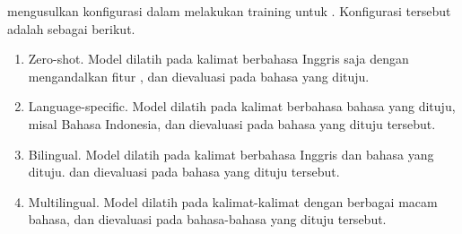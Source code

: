 \textcite{blloshmi2020} mengusulkan konfigurasi dalam melakukan training untuk \amrparsing{} .
Konfigurasi tersebut adalah sebagai berikut.
\begin{enumerate}
  \item Zero-shot.
  Model dilatih pada kalimat berbahasa Inggris saja dengan mengandalkan fitur , dan dievaluasi pada bahasa yang dituju.

  \item Language-specific.
  Model dilatih pada kalimat berbahasa bahasa yang dituju, misal Bahasa Indonesia, dan dievaluasi pada bahasa yang dituju tersebut.

  \item Bilingual.
  Model dilatih pada kalimat berbahasa Inggris dan bahasa yang dituju. dan dievaluasi pada bahasa yang dituju tersebut.

  \item Multilingual.
  Model dilatih pada kalimat-kalimat dengan berbagai macam bahasa, dan dievaluasi pada bahasa-bahasa yang dituju tersebut.
\end{enumerate}
